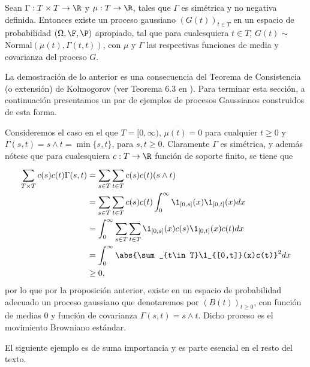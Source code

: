 \begin{prop} 
 Sean $\Gamma:T\times T\to \R$ y $\mu:T\to \R$, tales que $\Gamma$ es simétrica y no negativa definida. Entonces existe un proceso gaussiano $(G(t))_{t\in T}$ en un espacio de probabilidad $(\Omega, \F,\P)$ apropiado, tal que para cualesquiera $t\in T$, $G(t)\sim$ Normal$(\mu(t),\Gamma(t,t))$, con $\mu$ y $\Gamma$ las respectivas funciones de media y covarianza del proceso $G$.
 \end{prop}
 La demostración de lo anterior es una consecuencia del Teorema de Consistencia (o extensión) de Kolmogorov (ver Teorema 6.3 en \cite{gall2016brownian} ). Para terminar esta sección, a continuación presentamos un par de ejemplos de procesos Gaussianos construidos de esta forma.
\begin{ejem}
Consideremos el caso en el que $T=[0,\infty)$, $\mu(t)=0$ para cualquier $t\geq0$ y $\Gamma(s,t)=s\wedge t=\min\{s,t\}$, para $s,t\geq0$. Claramente $\Gamma$ es simétrica, y además nótese que para cualesquiera $c:T\to\R$ función de soporte finito, se tiene que
\begin{align*}
\sum_{T\times T}^{}c(s)c(t)\Gamma(s,t)&=\sum_{s\in T}^{}\sum_{t\in T}c(s)c(t)(s\wedge t)\\
&=\sum_{s\in T}^{}\sum_{t\in T}c(s)c(t)\int_{0}^{\infty}\1_{[0,s]}(x)\1_{[0,t]}(x)dx\\
&=\int_{0}^{\infty}\sum_{s\in T}\sum_{t\in T}\1_{[0,s]}(x)c(s)\1_{[0,t]}(x)c(t)dx\\
&=\int_{0}^{\infty}\abs{\sum_{t\in T}\1_{[0,t]}(x)c(t)}^2dx\\
&\geq0,
\end{align*}
por lo que por la proposición anterior, existe en un espacio de probabilidad adecuado un proceso gaussiano que denotaremos por $(B(t))_{t\geq0}$, con función de medias 0 y función de covarianza $\Gamma(s,t)=s\wedge t$. Dicho proceso es el movimiento Browniano estándar.
 \end{ejem}
El siguiente ejemplo es de suma importancia y es parte esencial en el resto del texto.

